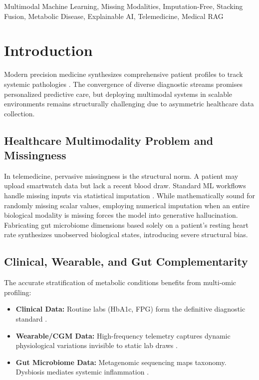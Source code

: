 \documentclass[journal, twocolumn]{IEEEtran}
\begin{document}
\begin{IEEEkeywords}
Multimodal Machine Learning, Missing Modalities, Imputation-Free, Stacking Fusion, Metabolic Disease, Explainable AI, Telemedicine, Medical RAG
\end{IEEEkeywords}

\section{Introduction}
Modern precision medicine synthesizes comprehensive patient profiles to track systemic pathologies \cite{topol2019high}. The convergence of diverse diagnostic streams promises personalized predictive care, but deploying multimodal systems in scalable environments remains structurally challenging due to asymmetric healthcare data collection.

\subsection{Healthcare Multimodality Problem and Missingness}
In telemedicine, pervasive missingness is the structural norm. A patient may upload smartwatch data but lack a recent blood draw. Standard ML workflows handle missing inputs via statistical imputation \cite{shickel2017ehr}. While mathematically sound for randomly missing scalar values, employing numerical imputation when an entire biological modality is missing forces the model into generative hallucination. Fabricating gut microbiome dimensions based solely on a patient's resting heart rate synthesizes unobserved biological states, introducing severe structural bias.

\subsection{Clinical, Wearable, and Gut Complementarity}
The accurate stratification of metabolic conditions \cite{eckell2015metabolic} benefits from multi-omic profiling:
\begin{itemize}
\item \textbf{Clinical Data:} Routine labs (HbA1c, FPG) form the definitive diagnostic standard \cite{ada2024standards}.
\item \textbf{Wearable/CGM Data:} High-frequency telemetry captures dynamic physiological variations invisible to static lab draws \cite{dunn2021wearables}.
\item \textbf{Gut Microbiome Data:} Metagenomic sequencing maps taxonomy. Dysbiosis mediates systemic inflammation \cite{goh2022microbiome}.
\end{itemize}
\end{document}
